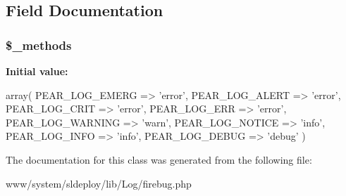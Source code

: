 \subsection{Field Documentation}
\hypertarget{class_log__firebug_a148e2042f169cec802078e58a46ace92}{
\subsubsection[{\$\_\-methods}]{\setlength{\rightskip}{0pt plus 5cm}\$\_\-methods}}
\label{class_log__firebug_a148e2042f169cec802078e58a46ace92}
{\bfseries Initial value:}
\begin{DoxyCode}
 array(
                        PEAR_LOG_EMERG   => 'error',
                        PEAR_LOG_ALERT   => 'error',
                        PEAR_LOG_CRIT    => 'error',
                        PEAR_LOG_ERR     => 'error',
                        PEAR_LOG_WARNING => 'warn',
                        PEAR_LOG_NOTICE  => 'info',
                        PEAR_LOG_INFO    => 'info',
                        PEAR_LOG_DEBUG   => 'debug'
                    )
\end{DoxyCode}


The documentation for this class was generated from the following file:\begin{DoxyCompactItemize}
\item 
www/system/sldeploy/lib/Log/firebug.php\end{DoxyCompactItemize}

